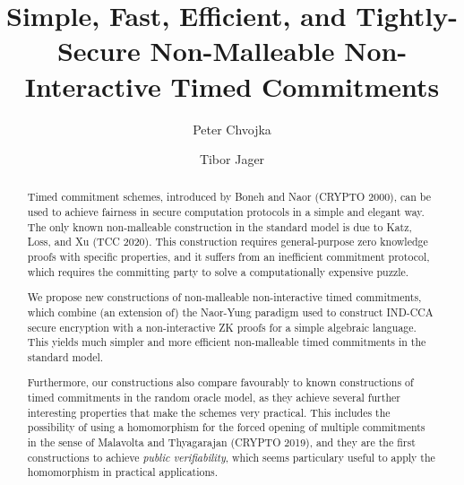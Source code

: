 \documentclass{llncs}
\author{Peter Chvojka\inst{1} \and Tibor Jager\inst{2}}
\institute{Institute of Rocket Science, \url{spam@rocketscience.es} \and University of Wuppertal, \url{jager@uni-wuppertal.de}}
\begin{document}
\title{Simple, Fast, Efficient, and Tightly-Secure Non-Malleable Non-Interactive Timed Commitments}


\maketitle
\begin{abstract}
Timed commitment schemes, introduced by Boneh and Naor (CRYPTO 2000), can be used to achieve fairness in secure computation protocols in a simple and elegant way.
The only known non-malleable construction in the standard model is due to Katz, Loss, and Xu (TCC 2020). This construction requires general-purpose zero knowledge proofs with specific properties, and it suffers from an inefficient commitment protocol, which requires the committing party to solve a computationally expensive puzzle.

We propose new constructions of non-malleable non-interactive timed commitments, which combine (an extension of) the Naor-Yung paradigm used to construct IND-CCA secure encryption with a non-interactive ZK proofs for a simple algebraic language. This yields much simpler and more efficient non-malleable timed commitments in the standard model.

Furthermore, our constructions also compare favourably to known constructions of timed commitments in the random oracle model, as they achieve several further interesting properties that make the schemes very practical. This includes the possibility of using a homomorphism for the forced opening of multiple commitments in the sense of Malavolta and Thyagarajan (CRYPTO 2019), and they are the first constructions to achieve \emph{public verifiability}, which seems particulary useful to apply the homomorphism in practical applications.
\end{abstract}


















\begin{appendix}

%


\end{appendix}
\end{document}
